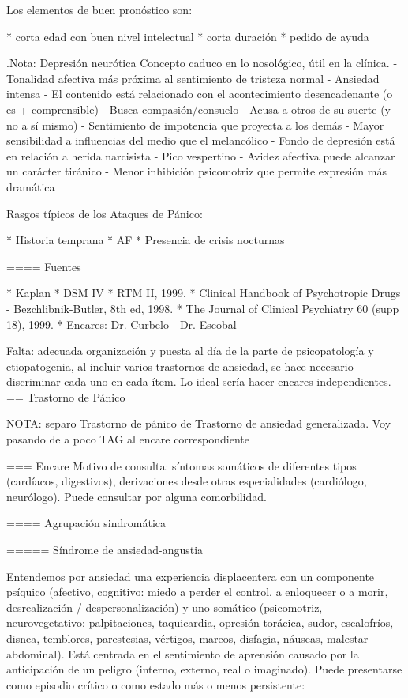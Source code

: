 \documentclass{scrbook}
\begin{document}
Los elementos de buen pronóstico son:

* corta edad con buen nivel intelectual
* corta duración
* pedido de ayuda


.Nota: Depresión neurótica
Concepto caduco en lo nosológico, útil en la clínica.
- Tonalidad afectiva más próxima al sentimiento de tristeza normal
- Ansiedad intensa
- El contenido está relacionado con el acontecimiento desencadenante (o es + comprensible)
- Busca compasión/consuelo
- Acusa a otros de su suerte (y no a sí mismo)
- Sentimiento de impotencia que proyecta a los demás
- Mayor sensibilidad a influencias del medio que el melancólico
- Fondo de depresión está en relación a herida narcisista
- Pico vespertino
- Avidez afectiva puede alcanzar un carácter tiránico
- Menor inhibición psicomotriz que permite expresión más dramática

Rasgos típicos de los Ataques de Pánico:

* Historia temprana
* AF
* Presencia de crisis nocturnas

==== Fuentes

* Kaplan
* DSM IV
* RTM II, 1999.
* Clinical Handbook of Psychotropic Drugs - Bezchlibnik-Butler, 8th ed, 1998.
* The Journal of Clinical Psychiatry 60 (supp 18), 1999.
* Encares: Dr. Curbelo - Dr. Escobal

Falta: adecuada organización y puesta al día de la parte de psicopatología y etiopatogenia, al incluir varios trastornos de ansiedad, se hace necesario discriminar cada uno en cada ítem. Lo ideal sería hacer encares independientes.
== Trastorno de Pánico

NOTA: separo Trastorno de pánico de Trastorno de ansiedad generalizada. Voy pasando de a poco TAG al encare correspondiente

=== Encare
Motivo de consulta: síntomas somáticos de diferentes tipos (cardíacos, digestivos), derivaciones desde otras especialidades (cardiólogo, neurólogo). Puede consultar por alguna comorbilidad.

==== Agrupación sindromática

===== Síndrome de ansiedad-angustia

Entendemos por ansiedad una experiencia displacentera con un componente psíquico (afectivo, cognitivo: miedo a perder el control, a enloquecer o a morir, desrealización / despersonalización) y uno somático (psicomotriz, neurovegetativo: palpitaciones, taquicardia, opresión torácica, sudor, escalofríos, disnea, temblores, parestesias, vértigos, mareos, disfagia, náuseas, malestar abdominal). Está centrada en el sentimiento de aprensión causado por la anticipación de un peligro (interno, externo, real o imaginado). Puede presentarse como episodio crítico o como estado más o menos persistente:
\end{document}
